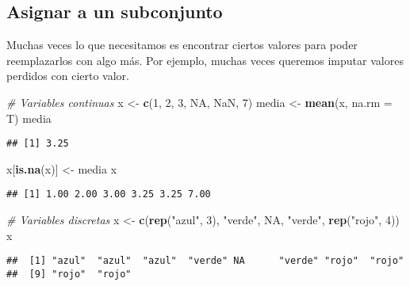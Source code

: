 \documentclass[]{article}
\newenvironment{Shaded}{\begin{snugshade}}{\end{snugshade}}
\newcommand{\KeywordTok}[1]{\textcolor[rgb]{0.13,0.29,0.53}{\textbf{#1}}}
\newcommand{\DataTypeTok}[1]{\textcolor[rgb]{0.13,0.29,0.53}{#1}}
\newcommand{\DecValTok}[1]{\textcolor[rgb]{0.00,0.00,0.81}{#1}}
\newcommand{\StringTok}[1]{\textcolor[rgb]{0.31,0.60,0.02}{#1}}
\newcommand{\CommentTok}[1]{\textcolor[rgb]{0.56,0.35,0.01}{\textit{#1}}}
\newcommand{\OtherTok}[1]{\textcolor[rgb]{0.56,0.35,0.01}{#1}}
\newcommand{\NormalTok}[1]{#1}
\begin{document}
\subsection{Asignar a un subconjunto}\label{asignar-a-un-subconjunto}

Muchas veces lo que necesitamos es encontrar ciertos valores para poder
reemplazarlos con algo más. Por ejemplo, muchas veces queremos imputar
valores perdidos con cierto valor.

\begin{Shaded}
\begin{Highlighting}[]
\CommentTok{# Variables continuas}
\NormalTok{x <-}\StringTok{ }\KeywordTok{c}\NormalTok{(}\DecValTok{1}\NormalTok{, }\DecValTok{2}\NormalTok{, }\DecValTok{3}\NormalTok{, }\OtherTok{NA}\NormalTok{, }\OtherTok{NaN}\NormalTok{, }\DecValTok{7}\NormalTok{)}
\NormalTok{media <-}\StringTok{ }\KeywordTok{mean}\NormalTok{(x, }\DataTypeTok{na.rm =}\NormalTok{ T)}
\NormalTok{media}
\end{Highlighting}
\end{Shaded}

\begin{verbatim}
## [1] 3.25
\end{verbatim}

\begin{Shaded}
\begin{Highlighting}[]
\NormalTok{x[}\KeywordTok{is.na}\NormalTok{(x)] <-}\StringTok{ }\NormalTok{media}
\NormalTok{x}
\end{Highlighting}
\end{Shaded}

\begin{verbatim}
## [1] 1.00 2.00 3.00 3.25 3.25 7.00
\end{verbatim}

\begin{Shaded}
\begin{Highlighting}[]
\CommentTok{# Variables discretas}
\NormalTok{x <-}\StringTok{ }\KeywordTok{c}\NormalTok{(}\KeywordTok{rep}\NormalTok{(}\StringTok{"azul"}\NormalTok{, }\DecValTok{3}\NormalTok{), }\StringTok{"verde"}\NormalTok{, }\OtherTok{NA}\NormalTok{, }\StringTok{"verde"}\NormalTok{, }\KeywordTok{rep}\NormalTok{(}\StringTok{"rojo"}\NormalTok{, }\DecValTok{4}\NormalTok{))}
\NormalTok{x}
\end{Highlighting}
\end{Shaded}

\begin{verbatim}
##  [1] "azul"  "azul"  "azul"  "verde" NA      "verde" "rojo"  "rojo" 
##  [9] "rojo"  "rojo"
\end{verbatim}
\end{document}
